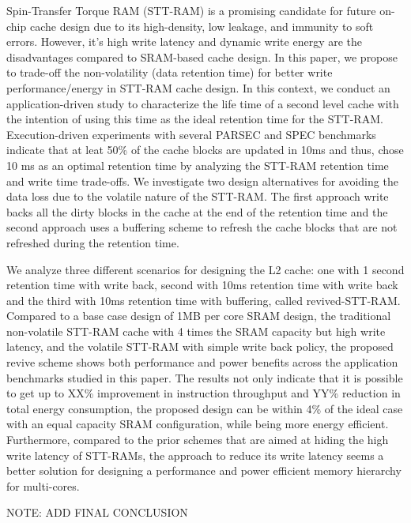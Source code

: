Spin-Transfer Torque RAM (STT-RAM) is a promising candidate for future
on-chip cache design due to its high-density, low leakage, and immunity to
soft errors.  However, it's high write latency and dynamic
write energy are the disadvantages compared to SRAM-based cache design.
In this paper, we propose to trade-off the non-volatility (data retention time)
for better write performance/energy in STT-RAM cache design.
In this context, we conduct an application-driven study to characterize the
life time of a second level cache with the intention of using this time as the ideal
retention time for the STT-RAM. Execution-driven experiments with several PARSEC and SPEC benchmarks
indicate that at leat 50\% of the cache blocks are updated in 10ms and thus, chose 10 ms
as an optimal retention time by analyzing the STT-RAM retention time and write time trade-offs.
We investigate two design alternatives for avoiding the data loss due to the volatile nature of the
STT-RAM. The first approach write backs all the dirty blocks in the cache at the end of the retention time
and the second approach uses a buffering scheme to refresh the cache blocks that are not refreshed
during the retention time.

We analyze three different scenarios for designing the L2 cache: one with 1 second retention time with write back,
second with 10ms retention time with write back and the third with 10ms retention time with buffering, called
revived-STT-RAM. Compared to a base case design of 1MB per core SRAM design, the traditional non-volatile STT-RAM
cache with 4 times the SRAM capacity but high write latency, and the volatile STT-RAM with simple write back policy,
the proposed revive scheme shows both performance and power benefits across the application benchmarks studied in
this paper. The results not only indicate that it is possible to get up to XX\% improvement in instruction
throughput and YY\% reduction in total energy consumption, the proposed design can be within 4\% of the ideal case
with an equal capacity SRAM configuration, while being more energy efficient.
Furthermore, compared to the prior schemes that are aimed at hiding the high write latency of STT-RAMs,
the approach to reduce its write latency seems a better solution for designing a performance and power efficient
memory hierarchy for multi-cores. 

NOTE: ADD FINAL CONCLUSION
